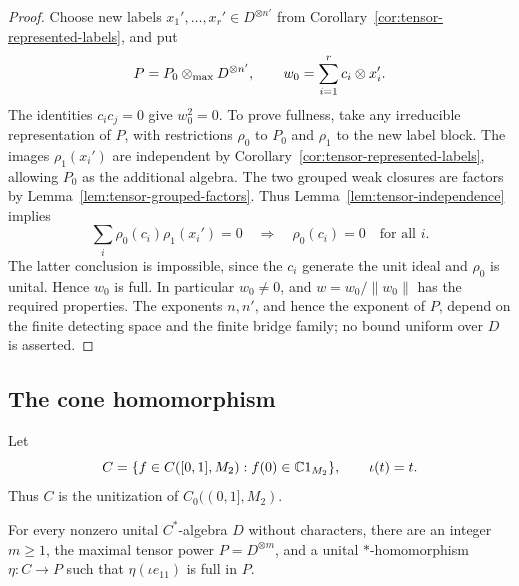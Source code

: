 \begin{proof}
Choose new labels \(x_1',\ldots,x_r'\in D^{\otimes n'}\) from
Corollary~\ref{cor:tensor-represented-labels}, and put
\[
 P=P_0\otimes_{\max} D^{\otimes n'},\qquad
                       w_0=\sum_{i=1}^r c_i\otimes x_i'.
\]
The identities \(c_i c_j=0\) give \(w_0^2=0\).
To prove fullness, take any irreducible representation of \(P\),
with restrictions \(\rho_0\) to \(P_0\) and \(\rho_1\) to the new
label block. The images \(\rho_1(x_i')\) are independent by
Corollary~\ref{cor:tensor-represented-labels}, allowing \(P_0\) as
the additional algebra. The two grouped weak closures are factors
by Lemma~\ref{lem:tensor-grouped-factors}. Thus
Lemma~\ref{lem:tensor-independence} implies
\[
       \sum_i\rho_0(c_i)\rho_1(x_i')=0
       \quad\Longrightarrow\quad
       \rho_0(c_i)=0\quad\text{for all }i.
\]
The latter conclusion is impossible, since the \(c_i\) generate the
unit ideal and \(\rho_0\) is unital. Hence \(w_0\) is full.
In particular \(w_0\ne0\), and \(w=w_0/\|w_0\|\) has the required
properties. The exponents \(n,n'\), and hence the exponent of \(P\),
depend on the finite detecting space and the finite bridge family;
no bound uniform over \(D\) is asserted.
\end{proof}

\subsection{The cone homomorphism}

Let
\[
 C=\{f\in C([0,1],M_2):f(0)\in\mathbb C1_{M_2}\},
 \qquad \iota(t)=t.
\]
Thus \(C\) is the unitization of \(C_0((0,1],M_2)\).

\begin{proposition}
\label{prop:full-cone}
For every nonzero unital \(C^*\)-algebra \(D\) without characters,
there are an integer \(m\ge1\), the maximal tensor power
\(P=D^{\otimes m}\), and a unital \(*\)-homomorphism
\(\eta:C\to P\) such that \(\eta(\iota e_{11})\) is full in \(P\).
\end{proposition}

